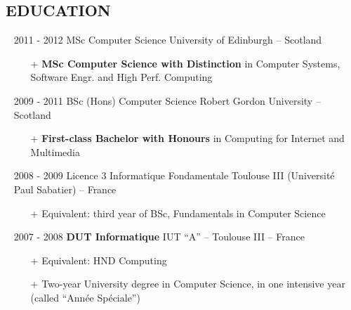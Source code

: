 \documentclass{res}
\begin{document}
  
\ifisanon
        \address{Some parts were removed. These are highlighted by \textit{(Anonymous)}}
\else

        \address{ \faMapMarker*~1-5-15 4F Sakaimachi, 802-0005 Japan ~~ \faPassport~France \\ \faAt~samuel@giffard.co ~~ \faMobile*~+32 (0) 4-84-14-10-33 ~~ \faMobile*~+33 (0) 7-69-69-12-02 \\ \\ \textbf{\faPython~Python Trainer, Engineer \& Evangelist} }
\fi

\begin{resume}
 
\section{\faGraduationCap~EDUCATION}
\begin{itemize} 
\item[] 2011 - 2012 \tabto{2cm} MSc Computer Science \hfill University of Edinburgh -- Scotland 
        \begin{itemize}
                \item[+] \textbf{MSc Computer Science with Distinction} in Computer Systems, Software Engr. and High Perf. Computing
        \end{itemize}
        
\item[] 2009 - 2011 \tabto{2cm} BSc (Hons) Computer Science \hfill Robert Gordon University -- Scotland 
        \begin{itemize}
                \item[+] \textbf{First-class Bachelor with Honours} in Computing for Internet and Multimedia
        \end{itemize}
        
\item[] 2008 - 2009 \tabto{2cm} Licence 3 Informatique Fondamentale \hfill Toulouse III (Universit\'e Paul Sabatier) -- France
        \begin{itemize}
                \item[+] Equivalent: third year of BSc, Fundamentals in Computer Science
        \end{itemize}

\item[] 2007 - 2008 \tabto{2cm} \textbf{DUT Informatique} \hfill IUT ``A'' -- Toulouse III -- France
        \begin{itemize}
                \item[+] Equivalent: HND Computing
                \item[+] Two-year University degree in Computer Science, in one intensive year (called ``Ann\'ee Sp\'eciale'')
        \end{itemize}


\end{itemize}
\end{resume}
\end{document}
